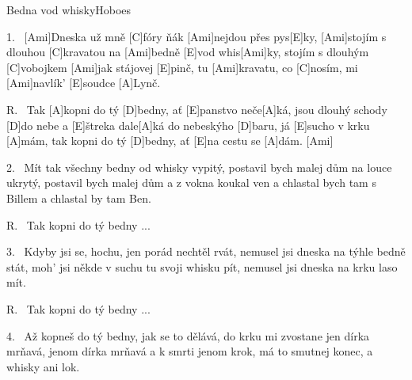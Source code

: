 \begin{song}{Bedna vod whisky}{Hoboes}

\begin{xverse}{1.~}
[\large Ami]Dneska už mně [\large C]fóry ňák [\large Ami]nejdou přes pys[\large E]ky,
[\large Ami]stojím s dlouhou [\large C]kravatou na [\large Ami]bedně [\large E]vod whis[\large Ami]ky,
stojím s dlouhým [\large C]vobojkem [\large Ami]jak stájovej [\large E]pinč,
tu [\large Ami]kravatu, co [\large C]nosím, mi [\large Ami]navlík' [\large E]soudce [\large A]Lynč.
\end{xverse}


\begin{xverse}{R.~}
Tak [\large A]kopni do tý [\large D]bedny, ať [\large E]panstvo neče[\large A]ká,
jsou dlouhý schody [\large D]do nebe a [\large E]{}štreka dale[\large A]ká
do nebeskýho [\large D]baru, já [\large E]sucho v krku [\large A]mám,
tak kopni do tý [\large D]bedny, ať [\large E]na cestu se [\large A]dám. [\large Ami]{}
\end{xverse}


\begin{xverse}{2.~}
Mít tak všechny bedny od whisky vypitý,
postavil bych malej dům na louce ukrytý,
postavil bych malej dům a z vokna koukal ven
a chlastal bych tam s Billem a chlastal by tam Ben.
\end{xverse}


\begin{xverse}{R.~}
Tak kopni do tý bedny ...
\end{xverse}


\begin{xverse}{3.~}
Kdyby jsi se, hochu, jen porád nechtěl rvát,
nemusel jsi dneska na týhle bedně stát,
moh' jsi někde v suchu tu svoji whisku pít,
nemusel jsi dneska na krku laso mít.
\end{xverse}


\begin{xverse}{R.~}
Tak kopni do tý bedny ...
\end{xverse}


\begin{xverse}{4.~}
Až kopneš do tý bedny, jak se to dělává,
do krku mi zvostane jen dírka mrňavá,
jenom dírka mrňavá a k smrti jenom krok,
má to smutnej konec, a whisky ani lok.
\end{xverse}




\end{song}

